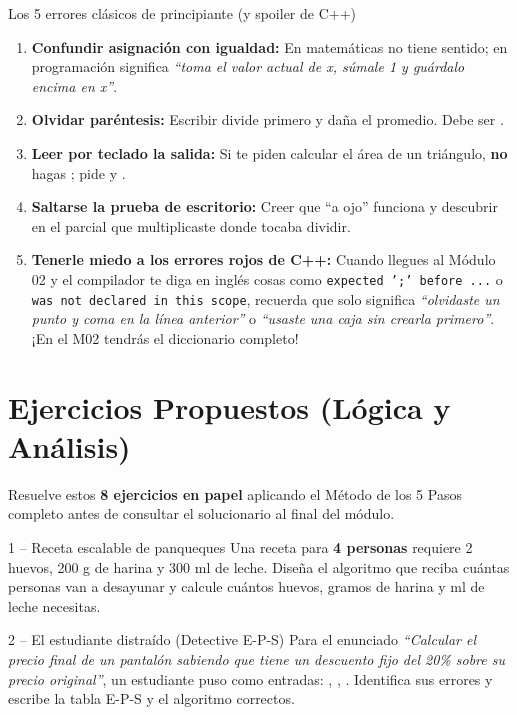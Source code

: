 \documentclass[11pt,letterpaper]{article}
\begin{document}
\begin{peligro}{Los 5 errores clásicos de principiante (y spoiler de C++)}
\begin{enumerate}
  \item \textbf{Confundir asignación con igualdad:} En matemáticas  no tiene sentido; en programación  significa \textit{``toma el valor actual de x, súmale 1 y guárdalo encima en x''}.
  \item \textbf{Olvidar paréntesis:} Escribir  divide primero  y daña el promedio. Debe ser .
  \item \textbf{Leer por teclado la salida:} Si te piden calcular el área de un triángulo, \textbf{no} hagas ; pide  y .
  \item \textbf{Saltarse la prueba de escritorio:} Creer que ``a ojo'' funciona y descubrir en el parcial que multiplicaste donde tocaba dividir.
  \item \textbf{Tenerle miedo a los errores rojos de C++:} Cuando llegues al Módulo 02 y el compilador te diga en inglés cosas como \texttt{expected ';' before ...} o \texttt{was not declared in this scope}, recuerda que solo significa \textit{``olvidaste un punto y coma en la línea anterior''} o \textit{``usaste una caja sin crearla primero''}. ¡En el M02 tendrás el diccionario completo!
\end{enumerate}
\end{peligro}

\section{Ejercicios Propuestos (Lógica y Análisis)}

Resuelve estos \textbf{8 ejercicios en papel} aplicando el Método de los 5 Pasos completo antes de consultar el solucionario al final del módulo.

\begin{ejercicio}{1 -- Receta escalable de panqueques}
Una receta para \textbf{4 personas} requiere 2 huevos, 200 g de harina y 300 ml de leche. Diseña el algoritmo que reciba cuántas personas van a desayunar y calcule cuántos huevos, gramos de harina y ml de leche necesitas.
\end{ejercicio}

\begin{ejercicio}{2 -- El estudiante distraído (Detective E-P-S)}
Para el enunciado \textit{``Calcular el precio final de un pantalón sabiendo que tiene un descuento fijo del 20\% sobre su precio original''}, un estudiante puso como entradas: , , . Identifica sus errores y escribe la tabla E-P-S y el algoritmo correctos.
\end{ejercicio}
\end{document}
